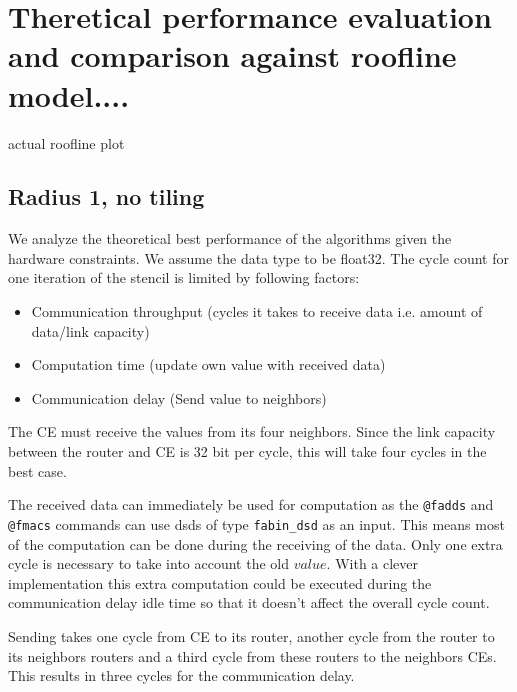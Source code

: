 \documentclass{article}
\begin{document}


\section{Theretical performance evaluation and comparison against roofline model....}
actual roofline plot
\subsection{Radius 1, no tiling}
We analyze the theoretical best performance of the algorithms given the hardware constraints.
We assume the data type to be float32.
The cycle count for one iteration of the stencil is limited by following factors:
\begin{itemize}
    \item Communication throughput (cycles it takes to receive data i.e. amount of data/link capacity)
    \item Computation time (update own value with received data)
    \item Communication delay (Send value to neighbors)
\end{itemize}
The CE must receive the values from its four neighbors. Since the link capacity between the router and CE is 32 bit per cycle, this will take four cycles in the best case.

The received data can immediately be used for computation as the \texttt{@fadds} and \texttt{@fmacs} commands can use dsds of type \texttt{fabin\_dsd} as an input. This means most of the computation can be done during the receiving of the data. Only one extra cycle is necessary to take into account the old $value$. With a clever implementation this extra computation could be executed during the communication delay idle time so that it doesn't affect the overall cycle count.

Sending takes one cycle from CE to its router, another cycle from the router to its neighbors routers and a third cycle from these routers to the neighbors CEs. This results in three cycles for the communication delay.
\end{document}
